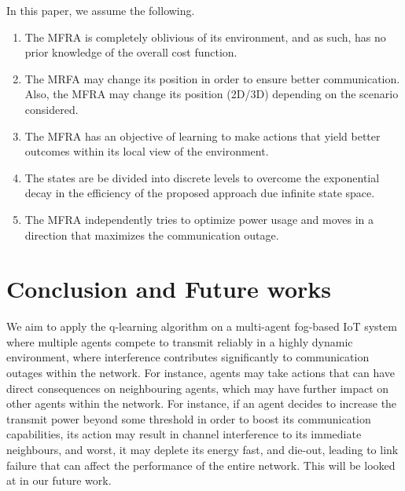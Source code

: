 \documentclass[journal]{IEEEtran}
\begin{document}
In this paper, we assume the following.
\begin{enumerate}
  \item The MFRA is completely oblivious of its environment, and as such, has no prior knowledge of the overall cost function.
  \item The MRFA may change its position in order to ensure better communication. Also, the MFRA may change its position (2D/3D) depending on the scenario considered.
  \item The MFRA has an objective of learning to make actions that yield better outcomes within its local view of the environment.
  \item The states are be divided into discrete levels to overcome the exponential decay in the efficiency of the proposed approach due infinite state space.
  \item The MFRA independently tries to optimize power usage and moves in a direction that maximizes the communication outage.
\end{enumerate}





\section{Conclusion and Future works}
We aim to apply the q-learning algorithm on a multi-agent fog-based IoT system where multiple agents compete to transmit reliably in a highly dynamic environment, where interference contributes significantly to communication outages within the network. For instance, agents may take actions that can have direct consequences on neighbouring agents, which may have further impact on other agents within the network. For instance, if an agent decides to increase the transmit power beyond some threshold in order to boost its communication capabilities, its action may result in channel interference to its immediate neighbours, and worst, it may deplete its energy fast, and die-out, leading to link failure that can affect the performance of the entire network. This will be looked at in our future work.




\ifCLASSOPTIONcaptionsoff
  \newpage
\fi


\end{document}
